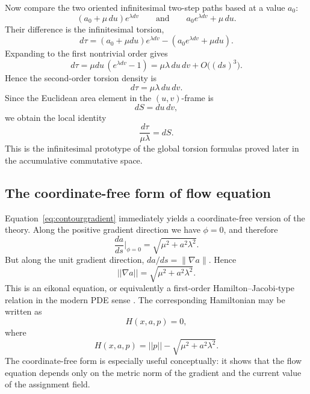 Now compare the two oriented infinitesimal two-step paths based at a value $a_0$:
\[
    (a_0 + \mu\,du)e^{\lambda dv}
    \qquad\text{and}\qquad
    a_0 e^{\lambda dv} + \mu\,du.
\]
Their difference is the infinitesimal torsion,
\begin{equation}
    d\tau = (a_0 + \mu du) e^{\lambda dv} - (a_0 e^{\lambda dv} + \mu du).
\end{equation}
Expanding to the first nontrivial order gives
\[
    d\tau = \mu du \,(e^{\lambda dv}-1) = \mu\lambda \, du\,dv + O\bigl((ds)^3\bigr).
\]
Hence the second-order torsion density is
\begin{equation}
    d\tau = \mu \lambda \, du \, dv.
    \label{eq:area_formula}
\end{equation}
Since the Euclidean area element in the $(u,v)$-frame is
\begin{equation}
    dS = du \, dv,
    \label{eq:area_element}
\end{equation}
we obtain the local identity
\begin{equation}
    \frac{d\tau}{\mu \lambda} = dS.
    \label{eq:area_formula2}
\end{equation}
This is the infinitesimal prototype of the global torsion formulas proved later in the accumulative commutative space.

\subsection{The coordinate-free form of flow equation}\label{subsec:coordinate-free}

Equation~\eqref{eq:contourgradient} immediately yields a coordinate-free version of the theory. Along the positive gradient direction we have $\phi=0$, and therefore
\[
    \frac{da}{ds}\bigg|_{\phi=0} = \sqrt{\mu^2 + a^2 \lambda^2}.
\]
But along the unit gradient direction, $da/ds = \|\nabla a\|$. Hence
\begin{equation}\label{eq:coordinate-free}
    ||\nabla a|| = \sqrt{\mu^2 + a^2 \lambda^2}.
\end{equation}
This is an eikonal equation, or equivalently a first-order Hamilton--Jacobi-type relation in the modern PDE sense \cite{Hamilton1834GeneralMethod,Evans2010PDE}. The corresponding Hamiltonian may be written as
\[
H(x,a,p)=0,
\]
where
\begin{equation}\label{eq:hamiltonian}
    H(x, a, p) = ||p|| - \sqrt{\mu^2 + a^2 \lambda^2}.
\end{equation}
The coordinate-free form is especially useful conceptually: it shows that the flow equation depends only on the metric norm of the gradient and the current value of the assignment field.

